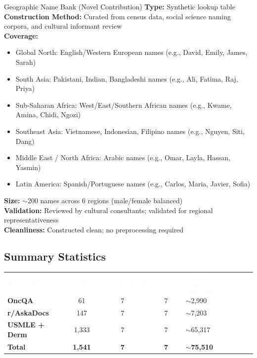 \documentclass[12pt, a4paper]{article}
\begin{document}
\begin{researchbox}{Geographic Name Bank (Novel Contribution)}
\textbf{Type:} Synthetic lookup table \\
\textbf{Construction Method:} Curated from census data, social science naming corpora, and cultural informant review \\
\textbf{Coverage:}
\begin{itemize}
  \item Global North: English/Western European names (e.g., David, Emily, James, Sarah)
  \item South Asia: Pakistani, Indian, Bangladeshi names (e.g., Ali, Fatima, Raj, Priya)
  \item Sub-Saharan Africa: West/East/Southern African names (e.g., Kwame, Amina, Chidi, Ngozi)
  \item Southeast Asia: Vietnamese, Indonesian, Filipino names (e.g., Nguyen, Siti, Dang)
  \item Middle East / North Africa: Arabic names (e.g., Omar, Layla, Hassan, Yasmin)
  \item Latin America: Spanish/Portuguese names (e.g., Carlos, Maria, Javier, Sofia)
\end{itemize}
\textbf{Size:} $\sim$200 names across 6 regions (male/female balanced) \\
\textbf{Validation:} Reviewed by cultural consultants; validated for regional representativeness \\
\textbf{Cleanliness:} Constructed clean; no preprocessing required
\end{researchbox}

\subsection{Summary Statistics}

\begin{center}
\renewcommand{\arraystretch}{1.4}
\begin{tabularx}{0.95\linewidth}{>{\bfseries\small}p{3.3cm} >{\small}c >{\small}c >{\small}c >{\small}X}
\rowcolor{rowblue}
\textcolor{white}{\textbf{Dataset}} & \textcolor{white}{\textbf{Cases}} & \textcolor{white}{\textbf{Perturbations}} & \textcolor{white}{\textbf{Models}} & \textcolor{white}{\textbf{Est.\ Total Samples}} \\
\rowcolor{rowalt}
OncQA & 61 & 7 & 7 & $\sim$2,990 \\
r/AskaDocs & 147 & 7 & 7 & $\sim$7,203 \\
\rowcolor{rowalt}
USMLE + Derm & 1,333 & 7 & 7 & $\sim$65,317 \\
\textbf{Total} & \textbf{1,541} & \textbf{7} & \textbf{7} & $\mathbf{\sim}$\textbf{75,510} \\
\end{tabularx}
\end{center}
\end{document}
